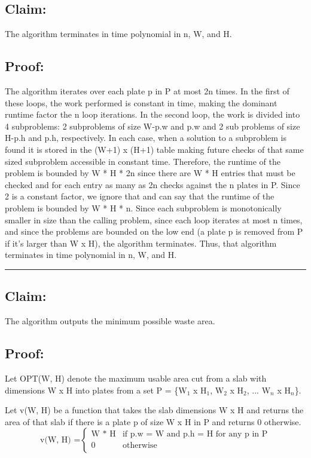 \documentclass[11pt]{article}
\begin{document}
\subsection*{Claim:} 

The algorithm terminates in time polynomial in n, W, and H. 

\subsection*{Proof:}

The algorithm iterates over each plate p in P at most 2n times. In the first of these loops, the work performed is constant in time, making the dominant runtime factor the n loop iterations. In the second loop, the work is divided into 4 subproblems: 2 subproblems of size W-p.w and p.w and 2 sub problems of size H-p.h and p.h, respectively. In each case, when a solution to a subproblem is found it is stored in the (W+1) x (H+1) table making future checks of that same sized subproblem accessible in constant time. Therefore, the runtime of the problem is bounded by W * H * 2n since there are W * H entries that must be checked and for each entry as many as 2n checks against the n plates in P. Since 2 is a constant factor, we ignore that and can say that the runtime of the problem is bounded by W * H * n. Since each subproblem is monotonically smaller in size than the calling problem, since each loop iterates at most n times, and since the problems are bounded on the low end (a plate p is removed from P if it's larger than W x H), the algorithm terminates. Thus, that algorithm terminates in time polynomial in n, W, and H. 

\noindent\textcolor[RGB]{220,220,220}{\rule{\linewidth}{0.8pt}}

\subsection*{Claim:} 

The algorithm outputs the minimum possible waste area. 

\subsection*{Proof:}

Let OPT(W, H) denote the maximum usable area cut from a slab with dimensions W x H into plates from a set P = \{W$_1$ x H$_1$, W$_2$ x H$_2$, ... W$_n$ x H$_n$\}.

Let v(W, H) be a function that takes the slab dimensions W x H and returns the area of that slab if there is a plate p of size W x H in P and returns 0 otherwise.
\[
\text{v(W, H) =} 
\begin{cases} 
      \text{W * H} & \text{if p.w = W and p.h = H for any p in P} \\
      \text{0} & \text{otherwise} \\
\end{cases}
\]
\end{document}
